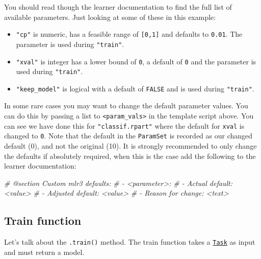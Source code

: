 \documentclass[
]{scrbook}
\newenvironment{Shaded}{\begin{snugshade}}{\end{snugshade}}
\newcommand{\CommentTok}[1]{\textcolor[rgb]{0.56,0.35,0.01}{\textit{#1}}}
\providecommand{\tightlist}{%
  \setlength{\itemsep}{0pt}\setlength{\parskip}{0pt}}
\renewenvironment{Shaded} {\begin{snugshade}\small} {\end{snugshade}}
\begin{document}
You should read though the learner documentation to find the full list of available parameters. Just looking at some of these in this example:

\begin{itemize}
\tightlist
\item
  \texttt{"cp"} is numeric, has a feasible range of \texttt{{[}0,1{]}} and defaults to \texttt{0.01}.
  The parameter is used during \texttt{"train"}.
\item
  \texttt{"xval"} is integer has a lower bound of \texttt{0}, a default of \texttt{0} and the parameter is used during \texttt{"train"}.
\item
  \texttt{"keep\_model"} is logical with a default of \texttt{FALSE} and is used during \texttt{"train"}.
\end{itemize}

In some rare cases you may want to change the default parameter values. You can do this by passing a list to \texttt{\textless{}param\_vals\textgreater{}} in the template script above. You can see we have done this for \texttt{"classif.rpart"} where the default for \texttt{xval} is changed to \texttt{0}. Note that the default in the \texttt{ParamSet} is recorded as our changed default (0), and not the original (10). It is strongly recommended to only change the defaults if absolutely required, when this is the case add the following to the learner documentation:

\begin{Shaded}
\begin{Highlighting}[]
\CommentTok{\#\textquotesingle{} @section Custom mlr3 defaults:}
\CommentTok{\#\textquotesingle{} {-} \textasciigrave{}\textless{}parameter\textgreater{}\textasciigrave{}:}
\CommentTok{\#\textquotesingle{}   {-} Actual default: \textless{}value\textgreater{}}
\CommentTok{\#\textquotesingle{}   {-} Adjusted default: \textless{}value\textgreater{}}
\CommentTok{\#\textquotesingle{}   {-} Reason for change: \textless{}text\textgreater{}}
\end{Highlighting}
\end{Shaded}

\hypertarget{learner-train}{%
\subsection{Train function}\label{learner-train}}

Let's talk about the \texttt{.train()} method.
The train function takes a \href{https://mlr3.mlr-org.com/reference/Task.html}{\texttt{Task}} as input and must return a model.
\end{document}
